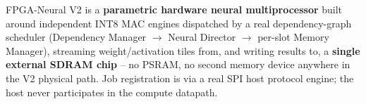 \thispagestyle{plain}
\noindent
{}

\vspace{6pt}
\noindent
{\small FPGA-Neural V2 is a \textbf{parametric hardware neural
multiprocessor} built around  independent INT8 MAC
engines dispatched by a real dependency-graph scheduler
(Dependency Manager $\to$ Neural Director $\to$ per-slot Memory
Manager), streaming weight/activation tiles from, and writing results
to, a \textbf{single external SDRAM chip} -- no PSRAM, no second
memory device anywhere in the V2 physical path. Job registration is
via a real SPI host protocol engine; the host never participates in
the compute datapath.}

